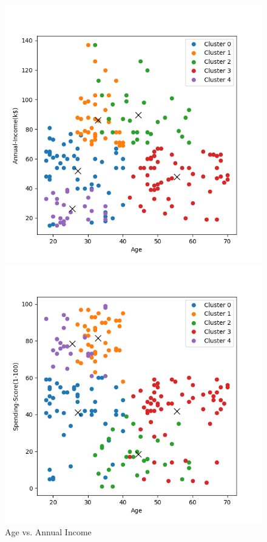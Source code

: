 \documentclass[8pt]{article}
\begin{document}
\begin{figure}[H]
    \centering
    \begin{minipage}{0.32\textwidth}
        \centering
        \includegraphics[width=\textwidth]{./Prob4/out/task1_rand14/images/cluster_result_k5_0_1.png}
        \caption{Age vs. Annual Income}
        \label{fig: Age vs. Annual Income k5}
    \end{minipage}
    \hfill
    \begin{minipage}{0.32\textwidth}
        \centering
        \includegraphics[width=\textwidth]{./Prob4/out/task1_rand14/images/cluster_result_k5_0_2.png}

\end{minipage}
\end{figure}
\end{document}
